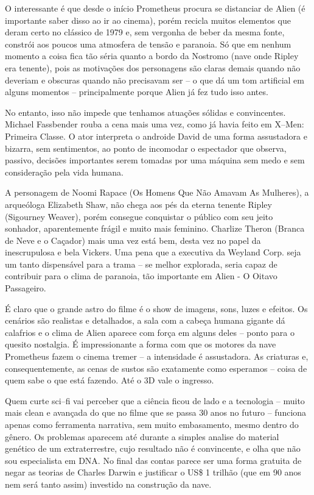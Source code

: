 \documentclass[a4paper,11pt,openright,openbib]{article}
\begin{document}
O interessante é que desde o início Prometheus procura se distanciar de Alien (é importante saber disso ao ir ao cinema), porém recicla muitos elementos que deram certo no clássico de 1979 e, sem vergonha de beber da mesma fonte, constrói aos poucos uma atmosfera de tensão e paranoia. Só que em nenhum momento a coisa fica tão séria quanto a bordo da Nostromo (nave onde Ripley era tenente), pois as motivações dos personagens são claras demais quando não deveriam e obscuras quando não precisavam ser – o que dá um tom artificial em alguns momentos – principalmente porque Alien já fez tudo isso antes.

No entanto, isso não impede que tenhamos atuações sólidas e convincentes. Michael Fassbender rouba a cena mais uma vez, como já havia feito em X–Men: Primeira Classe. O ator interpreta o androide David de uma forma assustadora e bizarra, sem sentimentos, ao ponto de incomodar o espectador que observa, passivo, decisões importantes serem tomadas por uma máquina sem medo e sem consideração pela vida humana. 

A personagem de Noomi Rapace (Os Homens Que Não Amavam As Mulheres), a arqueóloga Elizabeth Shaw, não chega aos pés da eterna tenente Ripley (Sigourney Weaver), porém consegue conquistar o público com seu jeito sonhador, aparentemente frágil e muito mais feminino. Charlize Theron (Branca de Neve e o Caçador) mais uma vez está bem, desta vez no papel da inescrupulosa e bela Vickers. Uma pena que a executiva da Weyland Corp. seja um tanto dispensável para a trama – se melhor explorada, seria capaz de contribuir para o clima de paranoia, tão importante em Alien - O Oitavo Passageiro.

É claro que o grande astro do filme é o show de imagens, sons, luzes e efeitos. Os cenários são realistas e detalhados, a sala com a cabeça humana gigante dá calafrios e o clima de Alien aparece com força em alguns deles – ponto para o quesito nostalgia. É impressionante a forma com que os motores da nave Prometheus fazem o cinema tremer – a intensidade é assustadora. As criaturas e, consequentemente, as cenas de sustos são exatamente como esperamos – coisa de quem sabe o que está fazendo. Até o 3D vale o ingresso.

Quem curte sci–fi vai perceber que a ciência ficou de lado e a tecnologia – muito mais clean e avançada do que no filme que se passa 30 anos no futuro – funciona apenas como ferramenta narrativa, sem muito embasamento, mesmo dentro do gênero. Os problemas aparecem até durante a simples analise do material genético de um extraterrestre, cujo resultado não é convincente, e olha que não sou especialista em DNA. No final das contas parece ser uma forma gratuita de negar as teorias de Charles Darwin e justificar o US\$ 1 trilhão (que em 90 anos nem será tanto assim) investido na construção da nave.
\end{document}
